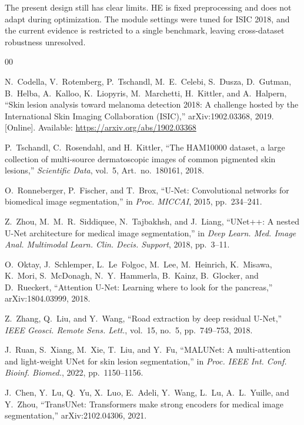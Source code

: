 \documentclass[conference]{IEEEtran}
\begin{document}
The present design still has clear limits. HE is fixed preprocessing and does not adapt during optimization. The module settings were tuned for ISIC 2018, and the current evidence is restricted to a single benchmark, leaving cross-dataset robustness unresolved.

\begin{thebibliography}{00}

N.~Codella, V.~Rotemberg, P.~Tschandl, M.~E.~Celebi, S.~Dusza, D.~Gutman, B.~Helba, A.~Kalloo, K.~Liopyris, M.~Marchetti, H.~Kittler, and A.~Halpern,
``Skin lesion analysis toward melanoma detection 2018: A challenge hosted by the International Skin Imaging Collaboration (ISIC),''
arXiv:1902.03368, 2019. [Online]. Available: \url{https://arxiv.org/abs/1902.03368}

P.~Tschandl, C.~Rosendahl, and H.~Kittler,
``The HAM10000 dataset, a large collection of multi-source dermatoscopic images of common pigmented skin lesions,''
\textit{Scientific Data}, vol.~5, Art.~no.~180161, 2018.

O.~Ronneberger, P.~Fischer, and T.~Brox,
``U-Net: Convolutional networks for biomedical image segmentation,''
in \textit{Proc. MICCAI}, 2015, pp.~234--241.

Z.~Zhou, M.~M.~R.~Siddiquee, N.~Tajbakhsh, and J.~Liang,
``UNet++: A nested U-Net architecture for medical image segmentation,''
in \textit{Deep Learn. Med. Image Anal. Multimodal Learn. Clin. Decis. Support}, 2018, pp.~3--11.

O.~Oktay, J.~Schlemper, L.~Le~Folgoc, M.~Lee, M.~Heinrich, K.~Misawa, K.~Mori, S.~McDonagh, N.~Y.~Hammerla, B.~Kainz, B.~Glocker, and D.~Rueckert,
``Attention U-Net: Learning where to look for the pancreas,''
arXiv:1804.03999, 2018.

Z.~Zhang, Q.~Liu, and Y.~Wang,
``Road extraction by deep residual U-Net,''
\textit{IEEE Geosci. Remote Sens. Lett.}, vol.~15, no.~5, pp.~749--753, 2018.

J.~Ruan, S.~Xiang, M.~Xie, T.~Liu, and Y.~Fu,
``MALUNet: A multi-attention and light-weight UNet for skin lesion segmentation,''
in \textit{Proc. IEEE Int. Conf. Bioinf. Biomed.}, 2022, pp.~1150--1156.

J.~Chen, Y.~Lu, Q.~Yu, X.~Luo, E.~Adeli, Y.~Wang, L.~Lu, A.~L.~Yuille, and Y.~Zhou,
``TransUNet: Transformers make strong encoders for medical image segmentation,''
arXiv:2102.04306, 2021.


\end{thebibliography}
\end{document}
